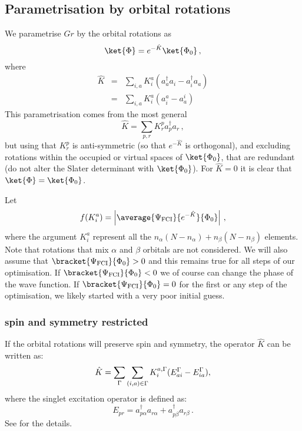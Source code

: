 \documentclass[a4paper,11pt]{article}
\begin{document}
\subsection{Parametrisation by orbital rotations}
We parametrise $Gr$ by the orbital rotations as\cite{}
\begin{equation}
  \ket{\Phi} = e^{-\hat{K}} \ket{\Phi_0}\,,
\end{equation}
where
\begin{eqnarray}
  \hat{K} &=& \sum_{i,a} K_i^a(a_a^\dagger a_i - a_i^\dagger a_a)\\
          &=& \sum_{i,a} K_i^a(a_i^a - a_a^i)\,
\end{eqnarray}
This parametrisation comes from the most general 
\begin{equation}
  \hat{K} = \sum_{p,r} K_r^pa_p^\dagger a_r\,,
\end{equation}
but using that $K_r^p$ is anti-symmetric (so that $e^{-\hat{K}}$ is orthogonal), and excluding rotations within the occupied or virtual spaces of $\ket{\Phi_0}$, that are redundant (do not alter the Slater determinant with $\ket{\Phi_0}$).
For $\hat{K} = 0$ it is clear that $\ket{\Phi} = \ket{\Phi_0}$.

Let
\begin{equation}
  f(K_i^a) = \left|\average{\Psi_\text{FCI}}{e^{-\hat{K}}}{\Phi_0}\right|\,,
\end{equation}
where the argument $K_i^a$ represent all the $n_\alpha(N-n_\alpha) + n_\beta(N-n_\beta)$ elements.
Note that rotations that mix $\alpha$ and $\beta$ orbitals are not considered.
We will also assume that $\bracket{\Psi_\text{FCI}}{\Phi_0} > 0$ and this remains true for all steps
of our optimisation.
If $\bracket{\Psi_\text{FCI}}{\Phi_0} < 0$ we of course can change the phase of the wave function.
If $\bracket{\Psi_\text{FCI}}{\Phi_0} = 0$ for the first or any step of the optimisation, we likely started with a very poor initial guess.

\subsubsection{spin and symmetry restricted}

If the orbital rotations will preserve spin and symmetry, the operator $\hat{K}$ can be written as:
\begin{equation}
  \hat{K} = \sum_{\Gamma} \sum_{(i,a) \in \Gamma} K_i^{a,\Gamma}(E_{ai}^{\Gamma} - E_{ia}^{\Gamma}),
\end{equation}
where the singlet excitation operator is defined as:
\begin{equation}
  E_{pr} = a_{p\alpha}^\dagger a_{r\alpha} + a_{p\beta}^\dagger a_{r\beta}\,.
\end{equation}
See \cite{helgaker00_molec} for the details.
\end{document}

